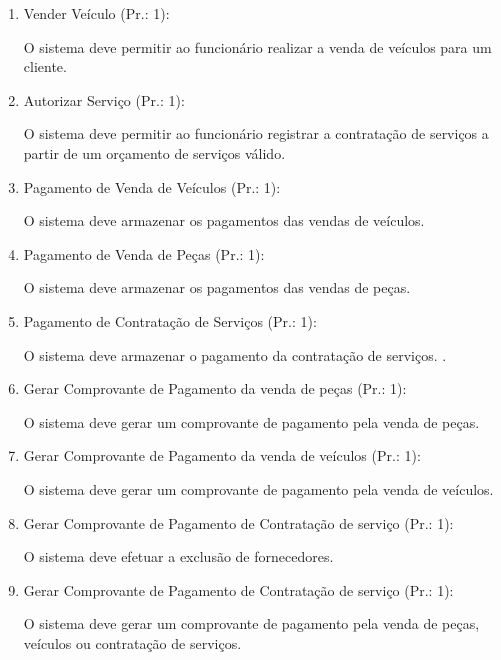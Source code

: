 \begin{enumerate}[
	label=RF\arabic{*}, 
	ref=(RF\arabic{*}),
	leftmargin=1.5em,
	itemindent=4.5em]
\item Vender Veículo (Pr.: 1):\par
O sistema deve permitir ao funcionário realizar a venda de veículos para um cliente.\par

\item Autorizar Serviço (Pr.: 1):\par
O sistema deve permitir ao funcionário registrar a contratação de serviços a partir de um orçamento de serviços válido.\par

\item Pagamento de Venda de Veículos (Pr.: 1):\par
O sistema deve armazenar os pagamentos das vendas de veículos. \par

\item Pagamento de Venda de Peças (Pr.: 1):\par
O sistema deve armazenar os pagamentos das vendas de peças.\par

\item Pagamento de Contratação de Serviços (Pr.: 1):\par
O sistema deve armazenar o pagamento da contratação de serviços. .\par

\item  Gerar Comprovante de Pagamento da venda de peças  (Pr.: 1):\par
O sistema deve gerar um comprovante de pagamento pela venda de peças.\par

\item Gerar Comprovante de Pagamento da venda de veículos  (Pr.: 1):\par
O sistema deve gerar um comprovante de pagamento pela venda de veículos.\par

\item  Gerar Comprovante de Pagamento de Contratação de serviço (Pr.: 1):\par
O sistema deve efetuar a exclusão de fornecedores.\par

\item Gerar Comprovante de Pagamento de Contratação de serviço (Pr.: 1):\par
O sistema deve gerar um comprovante de pagamento pela venda de peças, veículos ou contratação de serviços.\par


\end{enumerate}
